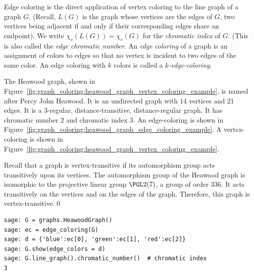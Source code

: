 Edge coloring is the direct application of vertex coloring to the
line graph of a graph $G$. (Recall, $L(G)$ is the graph whose
vertices are the edges of $G$, two vertices being adjacent if and
only if their corresponding edges share an endpoint).
We write $\chi_v(L(G)) = \chi_e(G)$ for the {\it chromatic index} of $G$.
(This is also called the {\it edge chromatic number}.
An {\it edge coloring} of a graph is an assignment of colors to
edges so that no vertex is
incident to two edges of the same color. An edge coloring with
$k$ colors is called a {\it $k$-edge-coloring}.

\begin{example}
\label{eg:graph_coloring:heawood_graph_example}
\rm
The Heawood graph, shown in
Figure~\ref{fig:graph_coloring:heawood_graph_vertex_coloring_example},
is named after Percy John Heawood.  It is an undirected graph with
$14$ vertices and $21$ edges.  It is a $3$-regular,
distance-transitive, distance-regular graph.  It has chromatic number
$2$ and chromatic index $3$.  An edge-coloring is shown in
Figure~\ref{fig:graph_coloring:heawood_graph_edge_coloring_example}.
A vertex-coloring is shown in
Figure~\ref{fig:graph_coloring:heawood_graph_vertex_coloring_example}.

Recall that a graph is vertex-transitive if its automorphism group
acts transitively upon its vertices.  The automorphism group of the
Heawood graph is isomorphic to the projective linear group $\PGL2(7)$,
a group of order $336$.  It acts transitively on the vertices and on
the edges of the graph.  Therefore, this graph is
vertex-transitive.\qed
\end{example}

\begin{lstlisting}
sage: G = graphs.HeawoodGraph()
sage: ec = edge_coloring(G)
sage: d = {'blue':ec[0], 'green':ec[1], 'red':ec[2]}
sage: G.show(edge_colors = d)
sage: G.line_graph().chromatic_number()  # chromatic index
3
\end{lstlisting}

